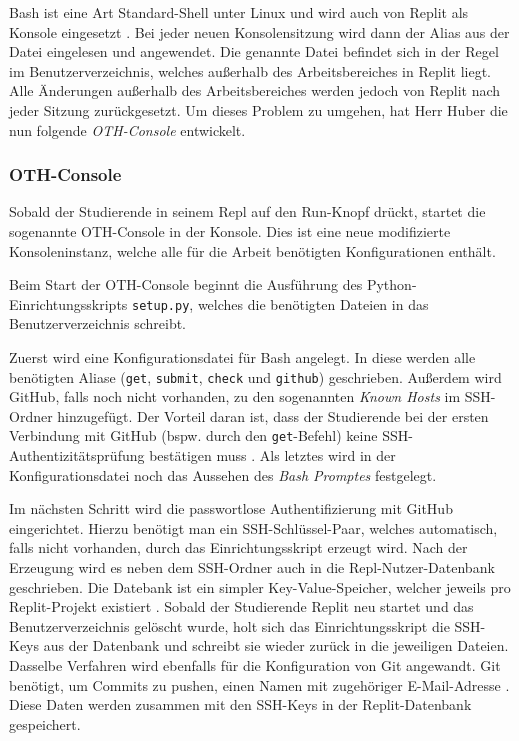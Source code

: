 Bash ist eine Art \glqq Standard-Shell\grqq{} unter Linux und wird auch von
Replit als Konsole eingesetzt \parencite{bash}. Bei jeder neuen Konsolensitzung
wird dann der Alias aus der Datei eingelesen und angewendet. Die genannte Datei
befindet sich in der Regel im Benutzerverzeichnis, welches außerhalb des
Arbeitsbereiches in Replit liegt. Alle Änderungen außerhalb des Arbeitsbereiches
werden jedoch von Replit nach jeder Sitzung zurückgesetzt. Um dieses Problem zu
umgehen, hat Herr Huber die nun folgende \emph{OTH-Console} entwickelt.

\subsubsection{OTH-Console}\label{replit-template-oth-console}
Sobald der Studierende in seinem Repl auf den Run-Knopf drückt, startet die
sogenannte OTH-Console in der Konsole. Dies ist eine neue
modifizierte Konsoleninstanz, welche alle für die Arbeit benötigten
Konfigurationen enthält.

Beim Start der OTH-Console beginnt die Ausführung des Python-Einrichtungsskripts
\texttt{setup.py}, welches die benötigten Dateien in das Benutzerverzeichnis
schreibt.

Zuerst wird eine Konfigurationsdatei für Bash angelegt. In diese werden alle
benötigten Aliase (\texttt{get}, \texttt{submit}, \texttt{check} und
\texttt{github}) geschrieben. Außerdem wird GitHub, falls noch nicht vorhanden,
zu den sogenannten \emph{Known Hosts} im SSH-Ordner hinzugefügt. Der Vorteil
daran ist, dass der Studierende bei der ersten Verbindung mit GitHub (bspw. durch
den \texttt{get}-Befehl) keine SSH-Authentizitätsprüfung bestätigen muss
\parencite{ssh}. Als letztes wird in der Konfigurationsdatei noch das Aussehen
des \emph{Bash Promptes} festgelegt.

Im nächsten Schritt wird die passwortlose Authentifizierung mit GitHub
eingerichtet. Hierzu benötigt man ein SSH-Schlüssel-Paar, welches automatisch,
falls nicht vorhanden, durch das Einrichtungsskript erzeugt wird. Nach der
Erzeugung wird es neben dem SSH-Ordner auch in die Repl-Nutzer-Datenbank
geschrieben. Die Datebank ist ein simpler Key-Value-Speicher, welcher jeweils
pro Replit-Projekt existiert \parencite{replit-database}. Sobald der Studierende
Replit neu startet und das Benutzerverzeichnis gelöscht wurde, holt sich das
Einrichtungsskript die SSH-Keys aus der Datenbank und schreibt sie wieder
zurück in die jeweiligen Dateien. Dasselbe Verfahren wird ebenfalls für die
Konfiguration von Git angewandt. Git benötigt, um Commits zu pushen, einen 
Namen mit zugehöriger E-Mail-Adresse \parencite{git-config}. Diese Daten werden
zusammen mit den SSH-Keys in der Replit-Datenbank gespeichert.

